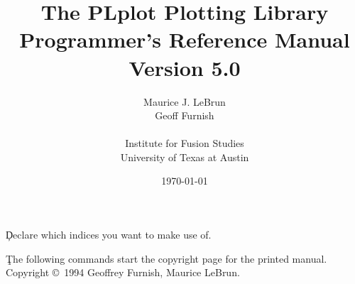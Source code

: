 %
%
%
%
%
%
%
%
%
%
%
%

\pagestyle{headings}



\c Declare which indices you want to make use of.

\title{ The PLplot Plotting Library \\ 
        Programmer's Reference Manual \\
        Version 5.0}
\author{
        Maurice J. LeBrun\\
        Geoff Furnish\\
\\
        Institute for Fusion Studies\\
        University of Texas at Austin\\
        }

\date{\today}
\maketitle

\c The following commands start the copyright page for the printed manual.
\clearpage
\vspace{0pt plus 1filll}
Copyright \copyright\ 1994 Geoffrey Furnish, Maurice LeBrun.

